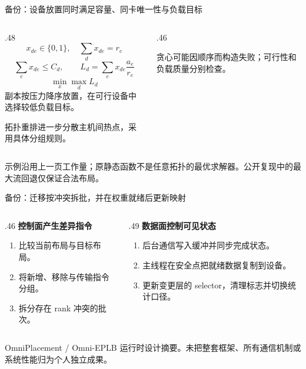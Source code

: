 \documentclass[aspectratio=169,10pt]{beamer}
\newcommand{\src}[1]{\vfill{\fontsize{6.7}{8}\selectfont\color{Muted}#1}\par}
\newcommand{\lead}[1]{{\color{Teal}\large\bfseries #1}\par\medskip}
\newcommand{\warn}[1]{\textcolor{Amber}{#1}}
\begin{document}
\begin{frame}{备份：设备放置同时满足容量、同卡唯一性与负载目标}
\begin{columns}[T]
\begin{column}{.48\textwidth}
\[x_{de}\in\{0,1\},\quad \sum_d x_{de}=r_e\]
\[\sum_e x_{de}\le C_d,\qquad L_d=\sum_e x_{de}\frac{a_e}{r_e}\]
\[\min_x\max_d L_d\]
副本按压力降序放置，在可行设备中选择较低负载目标。
\par\medskip
拓扑重排进一步分散主机间热点，采用具体分组规则。
\end{column}
\begin{column}{.46\textwidth}
\par\medskip
\warn{贪心可能因顺序而构造失败；可行性和负载质量分别检查。}
\end{column}
\end{columns}
\src{示例沿用上一页工作量；原静态函数不是任意拓扑的最优求解器。公开复现中的最大流回退仅保证合法布局。}
\end{frame}

\begin{frame}{备份：迁移按冲突拆批，并在权重就绪后更新映射}
\begin{columns}[T]
\begin{column}{.46\textwidth}
\lead{控制面产生差异指令}
\begin{enumerate}
\item 比较当前布局与目标布局。
\item 将新增、移除与传输指令分组。
\item 拆分存在 rank 冲突的批次。
\end{enumerate}
\end{column}
\begin{column}{.49\textwidth}
\lead{数据面控制可见状态}
\begin{enumerate}
\item 后台通信写入缓冲并同步完成状态。
\item 主线程在安全点把就绪数据复制到设备。
\item 更新变更层的 selector，清理标志并切换统计口径。
\end{enumerate}
\end{column}
\end{columns}
\medskip
\begin{center}
\end{center}
\src{OmniPlacement / Omni-EPLB 运行时设计摘要。未把整套框架、所有通信机制或系统性能归为个人独立成果。}
\end{frame}
\end{document}
